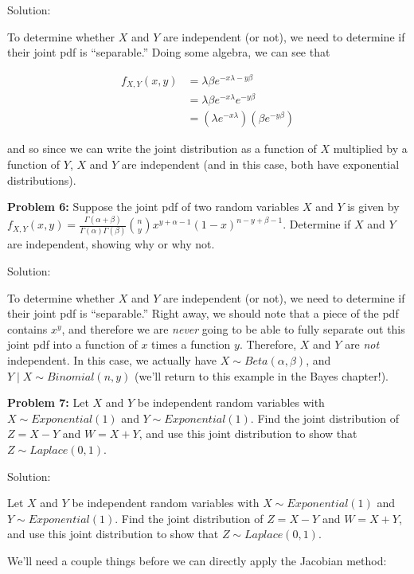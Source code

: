 \documentclass[
  letterpaper,
  DIV=11,
  numbers=noendperiod]{scrreprt}
\begin{document}
Solution:

To determine whether \(X\) and \(Y\) are independent (or not), we need
to determine if their joint pdf is ``separable.'' Doing some algebra, we
can see that

\begin{align*}    
f_{X,Y}(x,y) & = \lambda \beta e^{-x \lambda - y\beta} \\    
& = \lambda \beta e^{-x \lambda} e^{-y \beta} \\   
& = \left( \lambda  e^{-x \lambda} \right) \left( \beta e^{-y \beta} \right) 
\end{align*}

and so since we can write the joint distribution as a function of \(X\)
multiplied by a function of \(Y\), \(X\) and \(Y\) are independent (and
in this case, both have exponential distributions).

\textbf{Problem 6:} Suppose the joint pdf of two random variables \(X\)
and \(Y\) is given by
\(f_{X,Y}(x,y) = \frac{\Gamma(\alpha + \beta)}{\Gamma(\alpha) \Gamma(\beta)} \binom{n}{y} x^{y + \alpha - 1} (1-x)^{n-y + \beta - 1}\).
Determine if \(X\) and \(Y\) are independent, showing why or why not.

Solution:

To determine whether \(X\) and \(Y\) are independent (or not), we need
to determine if their joint pdf is ``separable.'' Right away, we should
note that a piece of the pdf contains \(x^y\), and therefore we are
\emph{never} going to be able to fully separate out this joint pdf into
a function of \(x\) times a function \(y\). Therefore, \(X\) and \(Y\)
are \emph{not} independent. In this case, we actually have
\(X \sim Beta(\alpha, \beta)\), and \(Y \mid X \sim Binomial(n, y)\)
(we'll return to this example in the Bayes chapter!).

\textbf{Problem 7:} Let \(X\) and \(Y\) be independent random variables
with \(X \sim Exponential(1)\) and \(Y \sim Exponential(1)\). Find the
joint distribution of \(Z = X - Y\) and \(W = X + Y\), and use this
joint distribution to show that \(Z \sim Laplace(0, 1)\).

Solution:

Let \(X\) and \(Y\) be independent random variables with
\(X \sim Exponential(1)\) and \(Y \sim Exponential(1)\). Find the joint
distribution of \(Z = X - Y\) and \(W = X + Y\), and use this joint
distribution to show that \(Z \sim Laplace(0, 1)\).

We'll need a couple things before we can directly apply the Jacobian
method:
\end{document}
